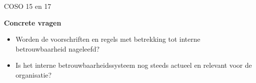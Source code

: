COSO 15 en 17

\textbf{Concrete vragen}
\begin{itemize}
    \item Worden de voorschriften en regels met betrekking tot interne betrouwbaarheid nageleefd?
    \item Is het interne betrouwbaarheidssysteem nog steeds actueel en relevant voor de organisatie?
\end{itemize}